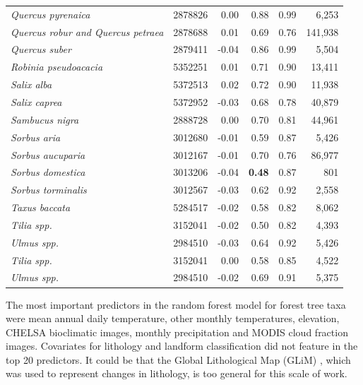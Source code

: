 \documentclass[fleqn,10pt,lineno]{wlpeerj} %
\begin{document}
\begin{center}
\begin{longtable}{lrrrrr}
\emph{Quercus pyrenaica}                 & 2878826 & 0.00  & 0.88 & 0.99 & 6,253   \\
\emph{Quercus robur and Quercus petraea} & 2878688 & 0.01  & 0.69 & 0.76 & 141,938 \\
\emph{Quercus suber}                    & 2879411 & -0.04 & 0.86 & 0.99 & 5,504   \\
\emph{Robinia pseudoacacia}              & 5352251 & 0.01  & 0.71 & 0.90 & 13,411  \\
\emph{Salix alba}                        & 5372513 & 0.02  & 0.72 & 0.90 & 11,938  \\
\emph{Salix caprea}                      & 5372952 & -0.03 & 0.68 & 0.78 & 40,879  \\
\emph{Sambucus nigra}                    & 2888728 & 0.00  & 0.70 & 0.81 & 44,961  \\
\emph{Sorbus aria}                       & 3012680 & -0.01 & 0.59 & 0.87 & 5,426   \\
\emph{Sorbus aucuparia}                  & 3012167 & -0.01 & 0.70 & 0.76 & 86,977  \\
\emph{Sorbus domestica}                  & 3013206 & -0.04 & \textbf{0.48} & 0.87 & 801     \\
\emph{Sorbus torminalis}                 & 3012567 & -0.03 & 0.62 & 0.92 & 2,558   \\
\emph{Taxus baccata}                     & 5284517 & -0.02 & 0.58 & 0.82 & 8,062   \\
\emph{Tilia spp.}                        & 3152041 & -0.02 & 0.50 & 0.82 & 4,393   \\
\emph{Ulmus spp.}                       & 2984510 & -0.03 & 0.64 & 0.92 & 5,426   \\
\emph{Tilia spp.}                        & 3152041 & 0.00  & 0.58 & 0.85 & 4,522   \\
\emph{Ulmus spp.}                        & 2984510 & -0.02 & 0.69 & 0.91 & 5,375  \\   
\bottomrule
\end{longtable}
\end{center}
\endgroup

The most important predictors in the random forest model for forest tree taxa were mean annual daily temperature, other monthly temperatures, elevation, CHELSA bioclimatic images, monthly precipitation and MODIS cloud fraction images. Covariates for lithology and landform classification did not feature in the top 20 predictors. It could be that the Global Lithological Map (GLiM) \citep{GGGE:GGGE2352}, which was used to represent changes in lithology, is too general for this scale of work. \par
\end{document}
